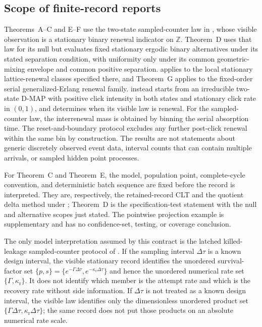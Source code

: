 \subsection{Scope of finite-record reports}\label{subsec:finite-record-report-scope-main}

Theorems~A--C and E--F use the two-state sampled-counter law in
, whose visible observation is a
stationary binary renewal indicator on \(\mathbb Z\).  Theorem~D uses that law
for its null but evaluates fixed stationary ergodic binary alternatives under
its stated separation condition, with uniformity only under its common
geometric-mixing envelope and common positive separation.
 applies to the local
stationary lattice-renewal classes specified there, and Theorem~G applies to
the fixed-order serial generalized-Erlang renewal family.
 instead starts from an
irreducible two-state D-MAP with positive click intensity in both states and
stationary click rate in \((0,1)\), and determines when its visible law is
renewal.  For the sampled-counter law, the interrenewal mass is obtained by
binning the serial
absorption time.  The reset-and-boundary protocol excludes any further
post-click renewal within the same bin by construction.  The results are not
statements about generic discretely observed event data, interval counts that
can contain multiple arrivals, or sampled hidden point processes.

For Theorem~C and Theorem~E, the model, population point, complete-cycle
convention, and deterministic batch sequence are fixed before the record is
interpreted.  They are, respectively, the retained-record CLT and the quotient
delta method under ; Theorem~D is the
specification-test statement with the null and alternative scopes just stated.
The pointwise projection example is supplementary and has no
confidence-set, testing, or coverage conclusion.

The only model interpretation assumed by this contract is the latched
killed-leakage sampled-counter protocol of
.  If the sampling
interval \(\Delta\tau\) is a known design interval, the visible stationary
record identifies the unordered survival-factor set
\(\{p,s\}=\{e^{-\Gamma\Delta\tau},e^{-\kappa_{\mathrm r}\Delta\tau}\}\) and
hence the unordered numerical rate set
\(\{\Gamma,\kappa_{\mathrm r}\}\).  It does not identify which member is the
attempt rate and which is the recovery rate without side information.  If
\(\Delta\tau\) is not treated as a known design interval, the visible law
identifies only the dimensionless unordered product set
\(\{\Gamma\Delta\tau,\kappa_{\mathrm r}\Delta\tau\}\); the same record does
not put those products on an absolute numerical rate scale.

